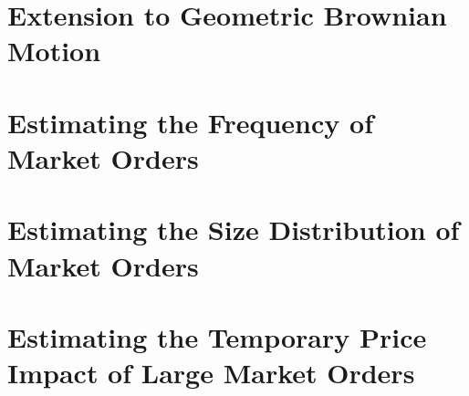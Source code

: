 \section{Extension to Geometric Brownian Motion}
\section{Estimating the Frequency of Market Orders}
\section{Estimating the Size Distribution of Market Orders}
\section{Estimating the Temporary Price Impact of Large Market Orders}